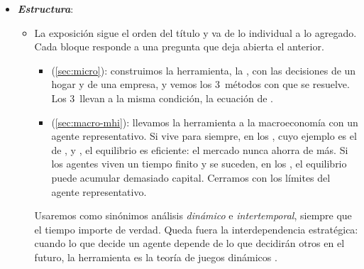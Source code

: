 \documentclass[11pt]{article}
\begin{document}
\begin{itemize}
\item \textbf{\emph{Estructura}}:
  \begin{itemize}
  \item La exposición sigue el orden del título y va de lo individual a lo agregado. Cada bloque responde a una pregunta que deja abierta el anterior.
  \begin{itemize}
  \item {} (\ref{sec:micro}): construimos la herramienta, la , con las decisiones de un hogar y de una empresa, y vemos los 3~métodos con que se resuelve. Los 3~llevan a la misma condición, la ecuación de .
  \item {} (\ref{sec:macro-mhi}): llevamos la herramienta a la macroeconomía con un agente representativo. Si vive para siempre, en los , cuyo ejemplo es el de ,  y , el equilibrio es eficiente: el mercado nunca ahorra de más. Si los agentes viven un tiempo finito y se suceden, en los , el equilibrio puede acumular demasiado capital. Cerramos con los límites del agente representativo.
  \end{itemize}
  Usaremos como sinónimos análisis \emph{dinámico} e \emph{intertemporal}, siempre que el tiempo importe de verdad. Queda fuera la interdependencia estratégica: cuando lo que decide un agente depende de lo que decidirán otros en el futuro, la herramienta es la teoría de juegos dinámicos .
  \end{itemize}
\end{itemize}
\end{document}
